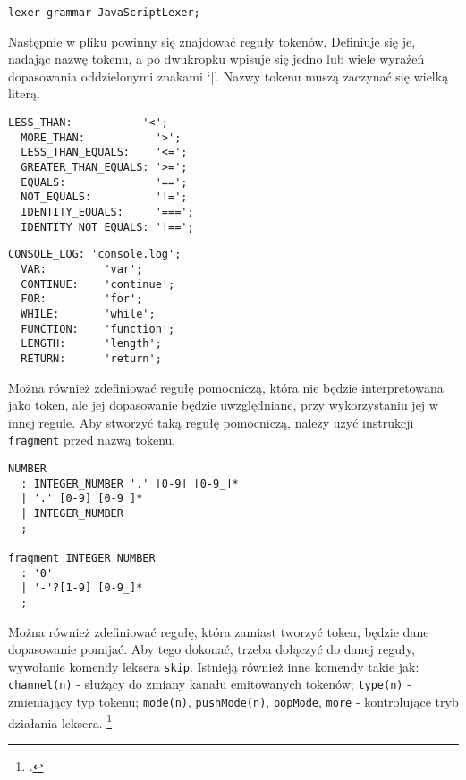 \begin{lstlisting}[caption=Deklaracja pliku do analizy leksykalnej, label=alg:antlrLex1]
  lexer grammar JavaScriptLexer;
\end{lstlisting}

Następnie w pliku powinny się znajdować reguły tokenów. Definiuje się je, nadając nazwę tokenu, a po dwukropku wpisuje się jedno lub wiele wyrażeń dopasowania oddzielonymi znakami `|'. Nazwy tokenu muszą zaczynać się wielką literą.


\begin{lstlisting}[caption=Przykład definicji tokenów dla znaków operacji porównania, label=alg:antlrLex2]
  LESS_THAN:           '<';
  MORE_THAN:           '>';
  LESS_THAN_EQUALS:    '<=';
  GREATER_THAN_EQUALS: '>=';
  EQUALS:              '==';
  NOT_EQUALS:          '!=';
  IDENTITY_EQUALS:     '===';
  IDENTITY_NOT_EQUALS: '!==';
\end{lstlisting}

\begin{lstlisting}[caption=Przykład definicji tokenów dla znaków słów kluczowych, label=alg:antlrLex3]
  CONSOLE_LOG: 'console.log';
  VAR:         'var';
  CONTINUE:    'continue';
  FOR:         'for';
  WHILE:       'while';
  FUNCTION:    'function';
  LENGTH:      'length';
  RETURN:      'return';
\end{lstlisting}

\par Można również zdefiniować regułę pomocniczą, która nie będzie interpretowana jako token, ale jej dopasowanie będzie uwzględniane, przy wykorzystaniu jej w innej regule. Aby stworzyć taką regułę pomocniczą, należy użyć instrukcji \texttt{fragment} przed nazwą tokenu.

\begin{lstlisting}[caption=Przykład definicji tokenu dla wielu dopasowań, label=alg:antlrLex4]
  NUMBER
  : INTEGER_NUMBER '.' [0-9] [0-9_]*
  | '.' [0-9] [0-9_]*
  | INTEGER_NUMBER
  ;

fragment INTEGER_NUMBER
  : '0'
  | '-'?[1-9] [0-9_]*
  ;
\end{lstlisting}

\par Można również zdefiniować regułę, która zamiast tworzyć token, będzie dane dopasowanie pomijać. Aby tego dokonać, trzeba dołączyć do danej reguły, wywołanie komendy leksera \texttt{skip}. Istnieją również inne komendy takie jak: \texttt{channel(n)} - służący do zmiany kanału emitowanych tokenów; \texttt{type(n)} - zmieniający typ tokenu; \texttt{mode(n)}, \texttt{pushMode(n)}, \texttt{popMode}, \texttt{more} - kontrolujące tryb działania leksera. \footcite{AntlrLexRules}

